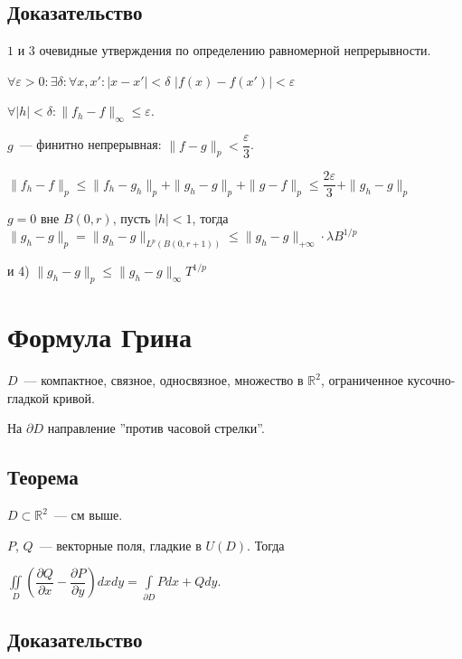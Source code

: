 \documentclass{article}
\begin{document}
        \subsection{Доказательство}
        
            $1$ и $3$ очевидные утверждения по определению равномерной непрерывности.
            
            $\forall \varepsilon > 0 : \exists \delta : \forall x, x' : |x - x'| < \delta$ $| f(x) - f(x')| < \varepsilon$
            
            $\forall |h| < \delta : \| f_h - f \|_{\infty} \leqslant \varepsilon$.
        
            $g$~--- финитно непрерывная: $\| f - g \|_p < \dfrac{\varepsilon}{3}$.
            
            $\| f_h - f \|_p \leqslant \| f_h - g_h \|_p + \| g_h - g \|_p + \| g - f \|_p \leqslant \dfrac{2 \varepsilon}{3} + \| g_h - g \|_p$
            
            $g = 0$ вне $B(0, r)$, пусть $|h| < 1$, тогда $\| g_h - g \|_p = \| g_h - g\|_{L^p \left( B(0, r + 1) \right)} \leqslant \| g_h - g \|_{+\infty} \cdot \lambda B^{1/p}$
            
            и 4) $\| g_h - g \|_p \leqslant \| g_h - g \|_{\infty} T^{1/p}$
            
\newpage

    \section{Формула Грина}
    
        $D$~--- компактное, связное, односвязное, множество в $\mathbb{R}^2$, ограниченное кусочно-гладкой кривой.
        
        На $\partial D$ направление ''против часовой стрелки''.
        
        \subsection{Теорема}
    
            $D \subset \mathbb{R}^2$~--- см выше.
        
            $P$, $Q$~--- векторные поля, гладкие в $U(D)$. Тогда
        
            $\iint\limits_D \left( \dfrac{\partial Q}{\partial x} - \dfrac{\partial P}{\partial y} \right) dx dy = \int\limits_{\partial D} P dx + Q dy$.
        
        \subsection{Доказательство}
        
\end{document}
